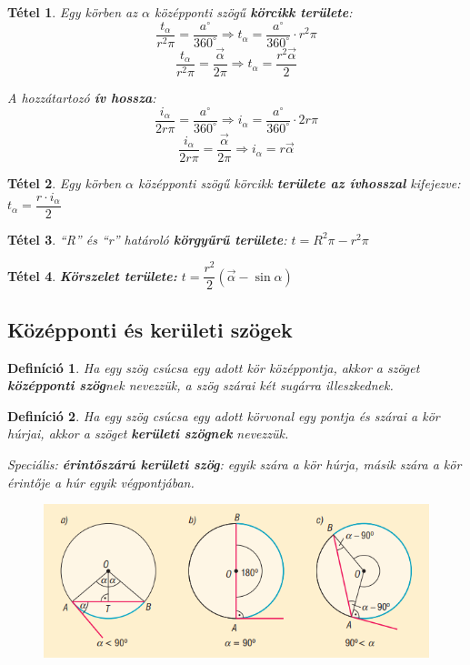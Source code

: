 \documentclass[12pt,a4paper]{article}
\newtheorem{theorem}{Tétel} [section]
\newtheorem{definition}{Definíció} [section]
\begin{document}
\begin{theorem}
Egy körben az $\alpha$ középponti szögű \textbf{körcikk területe}:
$$\dfrac{t_\alpha}{r^2\pi}=\dfrac{a^\circ}{360^\circ}\Rightarrow t_\alpha=\dfrac{a^\circ}{360^\circ}\cdot r^2\pi$$
$$\dfrac{t_\alpha}{r^2\pi}=\dfrac{\vec{\alpha}}{2\pi}\Rightarrow t_\alpha=\dfrac{r^2\vec{\alpha}}{2}$$

A hozzátartozó \textbf{ív hossza}:
$$\dfrac{i_\alpha}{2r\pi}=\dfrac{a^\circ}{360^\circ}\Rightarrow i_\alpha=\dfrac{a^\circ}{360^\circ}\cdot 2r\pi$$
$$\dfrac{i_\alpha}{2r\pi}=\dfrac{\vec{\alpha}}{2\pi}\Rightarrow i_\alpha = r\vec{\alpha}$$
\end{theorem}
\begin{theorem}
Egy körben $\alpha$ középponti szögű körcikk \textbf{területe az ívhosszal} kifejezve: $t_\alpha=\dfrac{r\cdot i_\alpha}{2}$
\end{theorem}

\begin{theorem}
``R'' és ``r'' határoló \textbf{körgyűrű területe}: $t=R^2\pi-r^2\pi$
\end{theorem}

\begin{theorem}
\textbf{Körszelet területe: } $t=\dfrac{r^2}{2}(\vec{\alpha}-\sin \alpha)$
\end{theorem}
\subsection{Középponti és kerületi szögek}

\begin{definition}
Ha egy szög csúcsa egy adott kör középpontja, akkor a szöget \textbf{középponti szög}nek nevezzük, a szög szárai két sugárra illeszkednek.
\end{definition}
\newpage
\begin{definition}
Ha egy szög csúcsa egy adott körvonal egy pontja és szárai a kör húrjai, akkor a szöget \textbf{kerületi szögnek} nevezzük.

Speciális: \textbf{érintőszárú kerületi szög}: egyik szára a kör húrja, másik szára a kör érintője a húr egyik végpontjában.
\end{definition}
\begin{figure}[h]
\centering
\includegraphics[scale=0.4]{geometry/keruleti_szog}
\end{figure}
\end{document}

